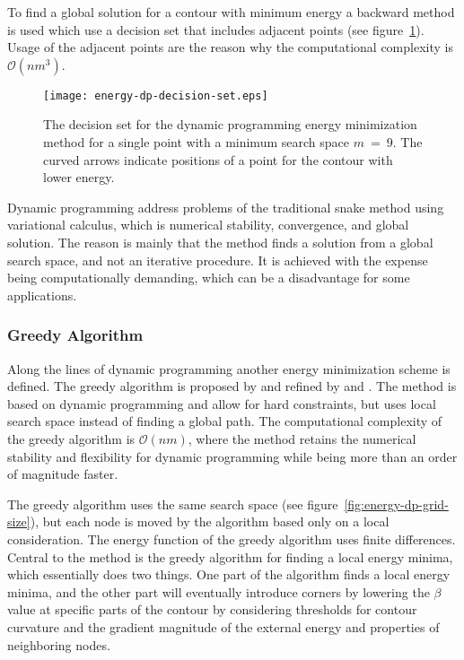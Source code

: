 To find a global solution for a contour with minimum energy a backward
method is used which use a decision set that includes adjacent points
(see figure~\ref{fig:energy-dp-decision-set}). Usage of the adjacent
points are the reason why the computational complexity is
$\mathcal{O}(nm^3)$.
\begin{figure}[htbp]
  \centering
  \texttt{[image: energy-dp-decision-set.eps]}
  \caption{The decision set for the dynamic programming energy
    minimization method for a single point with a minimum search space
    $m~=~9$. The curved arrows indicate positions of a point for the
    contour with lower energy.}
  \label{fig:energy-dp-decision-set}
\end{figure}
Dynamic programming address problems of the traditional snake method
using variational calculus, which is numerical stability, convergence,
and global solution. The reason is mainly that the method finds a
solution from a global search space, and not an iterative procedure.
It is achieved with the expense being computationally demanding, which
can be a disadvantage for some applications.

\subsubsection{Greedy Algorithm}
\label{sec:greedy-algorithm}


Along the lines of dynamic programming another energy minimization
scheme is defined. The greedy algorithm is proposed by
\citet{williams90} and refined by \citet{yan94} and \citet{yan97}. The
method is based on dynamic programming and allow for hard constraints,
but uses local search space instead of finding a global path. The
computational complexity of the greedy algorithm is $\mathcal{O}(nm)$,
where the method retains the numerical stability and flexibility for
dynamic programming while being more than an order of magnitude
faster.

The greedy algorithm uses the same search space (see
figure~\ref{fig:energy-dp-grid-size}), but each node is moved by the
algorithm based only on a local consideration. The energy function of
the greedy algorithm uses finite differences. Central to the method is
the greedy algorithm for finding a local energy minima, which
essentially does two things. One part of the algorithm finds a local
energy minima, and the other part will eventually introduce corners by
lowering the $\beta$ value at specific parts of the contour by
considering thresholds for contour curvature and the gradient magnitude of the
external energy and properties of neighboring nodes.

